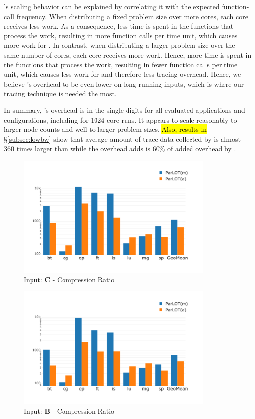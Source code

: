 \parlot 's scaling behavior can be explained by correlating it with the expected function-call frequency. When distributing a fixed problem size over more cores, each core receives less work. As a consequence, less time is spent in the functions that process the work, resulting in more function calls per time unit, which causes more work for \parlot. In contrast, when distributing a larger problem size over the same number of cores, each core receives more work. Hence, more time is spent in the functions that process the work, resulting in fewer function calls per time unit, which causes less work for \parlot and therefore less tracing overhead. Hence, we believe \parlot 's overhead to be even lower on long-running inputs, which is where our tracing technique is needed the most.


In summary, \parlot 's overhead is in the single digits for all evaluated applications and configurations, including for 1024-core runs. It appears to scale reasonably to larger node counts and well to larger problem sizes.\hl{ Also, results in} \S\ref{subsec:lowbw} show that average amount of trace data collected by \parlota is almost 360 times larger than \callgrind while the overhead \parlota adds is 60\% of added overhead by \callgrind.




\begin{figure}[t]
\centering
\includegraphics[width=3.8in]{figs.comet.newMed/comet_chartAvg_cr_C_p3_5.png}
\caption{ Input: \textbf{C}  - Compression Ratio
}
\label{comet_chartAvg_cr_C_p3_5}
\end{figure}

\begin{figure}[t]
\centering
\includegraphics[width=3.8in]{figs.comet.newMed/comet_chartAvg_cr_B_p3_5.png}
\caption{ Input: \textbf{B}  - Compression Ratio
}
\label{comet_chartAvg_cr_B_p3_5}
\end{figure}

